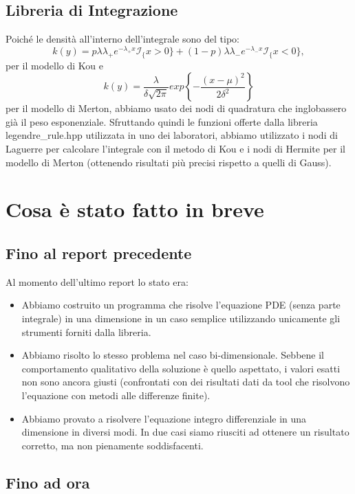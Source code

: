 \documentclass[a4paper,10pt]{article}
\begin{document}
\subsection{Libreria di Integrazione}
Poich\'e le densit\`a all'interno dell'integrale sono del tipo: $$k(y)=p\lambda\lambda_+e^{-\lambda_+x}\mathcal{I}_\{x>0\}+(1-p)\lambda\lambda_-e^{-\lambda_-x}\mathcal{I}_\{x<0\},$$ per il modello di Kou e $$k(y)=\frac{\lambda}{\delta\sqrt{2\pi}}exp\left\{-\frac{(x-\mu)^2}{2\delta^2}\right\}$$ per il modello di Merton, abbiamo usato dei nodi di quadratura che inglobassero gi\`a il peso esponenziale. Sfruttando quindi le funzioni offerte dalla libreria \textsf{legendre\_rule.hpp} utilizzata in uno dei laboratori, abbiamo utilizzato i nodi di Laguerre per calcolare l'integrale con il metodo di Kou e i nodi di Hermite per il modello di Merton (ottenendo risultati pi\`u precisi rispetto a quelli di Gauss).

\section{Cosa è stato fatto in breve}

\subsection{Fino al report precedente}
Al momento dell'ultimo report lo stato era:

\begin{itemize}
 \item Abbiamo costruito un programma che risolve l'equazione PDE  (senza parte integrale) in una dimensione in un caso semplice utilizzando unicamente gli strumenti forniti dalla libreria.
 \item Abbiamo risolto lo stesso problema nel caso bi-dimensionale. Sebbene il comportamento qualitativo della soluzione è quello aspettato, i valori esatti non sono ancora giusti (confrontati con dei risultati dati da tool che risolvono l'equazione con metodi alle differenze finite).
 \item Abbiamo provato a risolvere l'equazione integro differenziale in una dimensione in diversi modi. In due casi siamo riusciti ad ottenere un risultato corretto, ma non pienamente soddisfacenti.
\end{itemize}

\subsection{Fino ad ora}
\end{document}
